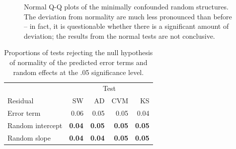\documentclass[12pt]{article} %
\begin{document}
\begin{figure}[htb]
	\centering
	\caption{\label{fig:lcqq} Normal Q-Q plots of the minimally confounded random structures. The deviation from normality are much less pronounced than before -- in fact, it is questionable whether there is a significant amount of deviation; the results from the normal tests are not conclusive.}
\end{figure}

\begin{table}[ht]
\caption{\label{tab:edf2} Proportions of tests rejecting the null hypothesis of normality of the predicted error terms and random effects at the .05 significance level. 
}
\begin{center}
\begin{tabular}{l rrrr} \hline
 & \multicolumn{4}{c}{Test} \\  \cline{2-5}
 Residual & SW &  AD & CVM & KS \\ \hline
Error term			& 0.06 & 0.05 & 0.05 & 0.04 \\
Random intercept 	& \bf 0.04 & \bf 0.05 & \bf 0.05 & \bf 0.05 \\
Random slope 		& \bf 0.04 & \bf 0.04 & \bf 0.05 & \bf 0.05 \\
   \hline
\end{tabular}
\end{center}
\end{table}
\end{document}
